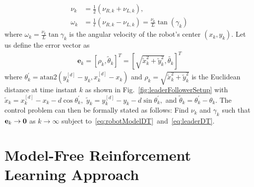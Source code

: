 \documentclass[conference]{IEEEtran}
\begin{document}
 \begin{subequations}
   \begin{align}
     \nu_{k} &= \frac{1}{2}(\nu_{R,k} + \nu_{L,k}),\\
     \omega_{k} &= \frac{1}{\ell}(\nu_{R,k} - \nu_{L,k}) = \frac{\nu_{k}}{L}\tan(\gamma_k) 	
   \end{align}
 \label{eq:robotModel1-DT}
 \end{subequations}
 where $\omega_k = \frac{\nu_k}{L}\tan\gamma_k$ is the angular velocity of the robot's center $(x_k,y_k).$ Let us define the error vector as 
 \begin{align}
     \label{eq:stateError}
   \mathbf{e}_k = [\rho_k,\tilde\theta_k]^T=[\sqrt{\tilde{x}_k^2+\tilde{y}_k^2},\tilde{\theta_k}]^T%
 \end{align}
% 
 where $\theta_k^{'} = \mathrm{atan2}\left(y_k^{[d]}-y_k, x_k^{[d]}-x_k\right)$
 and ${\rho_k} =\sqrt{\tilde{x}_k^2+\tilde{y}_k^2} $ is the Euclidean distance at time instant $k$ as shown in Fig.~\ref{fig:leaderFollowerSetup} with $\tilde{x}_k = x_k^{[d]} - x_k - d\cos\theta_k^{'},$ $\tilde{y}_k = y_k^{[d]} - y_k - d\sin\theta_k^{'},$ and $\tilde{\theta}_k = \theta_k^{'} - \theta_k.$ The control problem can then be formally stated as follows: Find $\nu_k$ and $\gamma_k$ such that ${\bf e}_k\to {\bf 0}$ as  $k\to\infty$ subject to~\eqref{eq:robotModelDT}~and~\eqref{eq:leaderDT}.

%
%




\section{Model-Free Reinforcement Learning Approach}
 \label{sec:RLSolution}
\end{document}
